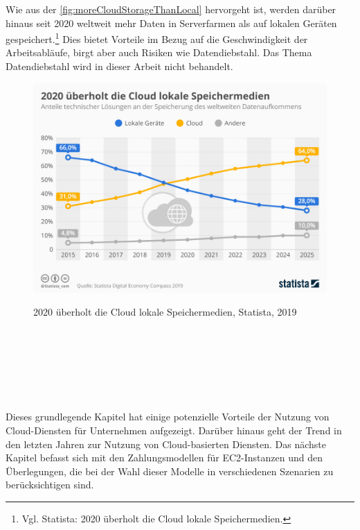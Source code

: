 Wie aus der \autoref{fig:moreCloudStorageThanLocal} hervorgeht ist, werden darüber hinaus seit 2020 weltweit mehr Daten in Serverfarmen als auf lokalen Geräten gespeichert.\footnote{Vgl. Statista: 2020 überholt die Cloud lokale Speichermedien.\cite{STA1}} Dies bietet Vorteile im Bezug auf die Geschwindigkeit der Arbeitsabläufe, birgt aber auch Risiken wie Datendiebstahl. Das Thema Datendiebstahl wird in dieser Arbeit nicht behandelt.%
\begin{figure}[h!]
      \centering
      \includegraphics[scale=0.4]{sources/moreCloudStorageThanLocal}
      \caption[2020 überholt die Cloud lokale Speichermedien]{}\label{fig:moreCloudStorageThanLocal}
      2020 überholt die Cloud lokale Speichermedien, Statista, 2019 {\cite{STA1}}
\end{figure}
\\\\
\\\\
\\\\
Dieses grundlegende Kapitel hat einige potenzielle Vorteile der Nutzung von Cloud-Diensten für Unternehmen aufgezeigt. Darüber hinaus geht der Trend in den letzten Jahren zur Nutzung von Cloud-basierten Diensten. Das nächste Kapitel befasst sich mit den Zahlungsmodellen für EC2-Instanzen und den Überlegungen, die bei der Wahl dieser Modelle in verschiedenen Szenarien zu berücksichtigen sind.
\newpage

